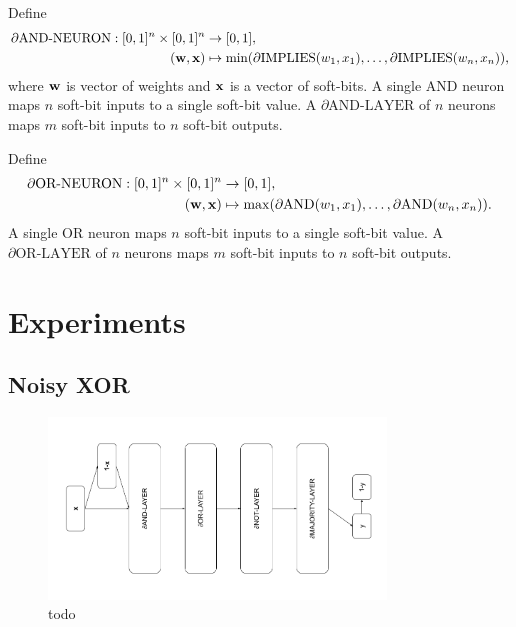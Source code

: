 \documentclass{article} %
\begin{document}

Define
\begin{equation*}
\begin{aligned}
\partial\text{AND-NEURON}: [0,1]^{n} \times [0,1]^{n} &\to [0,1], \\
({\bf w}, {\bf x}) &\mapsto \min(\partial\text{IMPLIES}(w_{1}, x_{1}), \dots, \partial\text{IMPLIES}(w_{n}, x_{n}))\text{,}
\end{aligned}
\end{equation*}
where ${\bf w}$ is vector of weights and ${\bf x}$ is a vector of soft-bits. A single AND neuron maps $n$ soft-bit inputs to a single soft-bit value. A $\partial\text{AND-LAYER}$ of $n$ neurons maps $m$ soft-bit inputs to $n$ soft-bit outputs.

Define
\begin{equation*}
\begin{aligned}
\partial\text{OR-NEURON}: [0,1]^{n} \times [0,1]^{n} &\to [0,1], \\
({\bf w}, {\bf x}) &\mapsto \max(\partial\text{AND}(w_{1}, x_{1}), \dots, \partial\text{AND}(w_{n}, x_{n}))\text{.}
\end{aligned}
\end{equation*}
A single OR neuron maps $n$ soft-bit inputs to a single soft-bit value. A $\partial\text{OR-LAYER}$ of $n$ neurons maps $m$ soft-bit inputs to $n$ soft-bit outputs.


\section{Experiments}

\subsection{Noisy XOR}

\begin{figure}[h]
	\centering
	\includegraphics[width=0.8\textwidth]{noisy-xor-architecture.png}
	\caption{todo}
	\label{fig:noisy-xor-architecture}
\end{figure}
\end{document}
